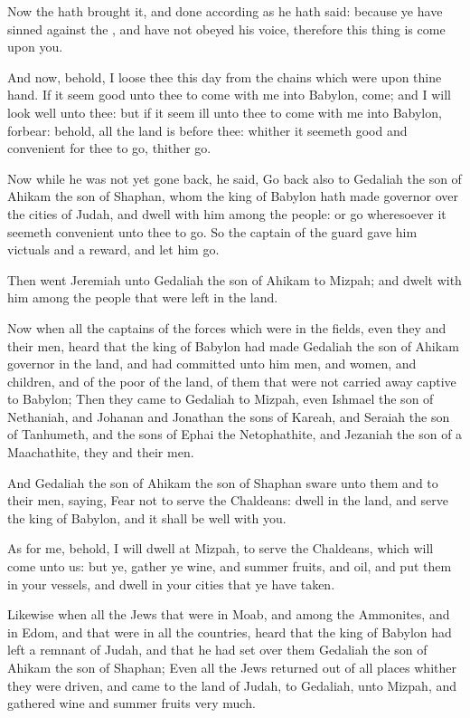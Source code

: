 \verse Now the \LORD hath brought it, and done according as he hath said: because ye have sinned against the \LORD, and have not obeyed his voice, therefore this thing is come upon you.

\verse And now, behold, I loose thee this day from the chains which were upon thine hand. If it seem good unto thee to come with me into Babylon, come; and I will look well unto thee: but if it seem ill unto thee to come with me into Babylon, forbear: behold, all the land is before thee: whither it seemeth good and convenient for thee to go, thither go.

\verse Now while he was not yet gone back, he said, Go back also to Gedaliah the son of Ahikam the son of Shaphan, whom the king of Babylon hath made governor over the cities of Judah, and dwell with him among the people: or go wheresoever it seemeth convenient unto thee to go. So the captain of the guard gave him victuals and a reward, and let him go.

\verse Then went Jeremiah unto Gedaliah the son of Ahikam to Mizpah; and dwelt with him among the people that were left in the land.

\verse Now when all the captains of the forces which were in the fields, even they and their men, heard that the king of Babylon had made Gedaliah the son of Ahikam governor in the land, and had committed unto him men, and women, and children, and of the poor of the land, of them that were not carried away captive to Babylon; \verse Then they came to Gedaliah to Mizpah, even Ishmael the son of Nethaniah, and Johanan and Jonathan the sons of Kareah, and Seraiah the son of Tanhumeth, and the sons of Ephai the Netophathite, and Jezaniah the son of a Maachathite, they and their men.

\verse And Gedaliah the son of Ahikam the son of Shaphan sware unto them and to their men, saying, Fear not to serve the Chaldeans: dwell in the land, and serve the king of Babylon, and it shall be well with you.

\verse As for me, behold, I will dwell at Mizpah, to serve the Chaldeans, which will come unto us: but ye, gather ye wine, and summer fruits, and oil, and put them in your vessels, and dwell in your cities that ye have taken.

\verse Likewise when all the Jews that were in Moab, and among the Ammonites, and in Edom, and that were in all the countries, heard that the king of Babylon had left a remnant of Judah, and that he had set over them Gedaliah the son of Ahikam the son of Shaphan; \verse Even all the Jews returned out of all places whither they were driven, and came to the land of Judah, to Gedaliah, unto Mizpah, and gathered wine and summer fruits very much.

